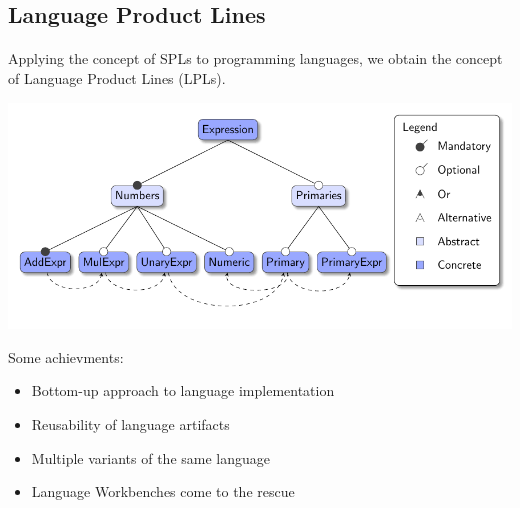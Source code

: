 \documentclass[9pt,xcolor=table,svgnames]{beamer}
\begin{document}
\subsection[LPLs]{Language Product Lines}
\begin{frame}{\secname}
    \framesubtitle{\subsecname}
    Applying the concept of SPLs to programming languages, we obtain the concept of \alert{Language Product Lines} (LPLs).

    \bigskip
    \includegraphics[width=1\textwidth]{figs/feature-model.pdf}

    \pause

    \huge Some achievments:
    \begin{itemize}
        \item \alert{Bottom-up} approach to language implementation
        \item \alert{Reusability} of language artifacts
        \item Multiple \alert{variants} of the same language
        \item \alert{Language Workbenches} come to the rescue
    \end{itemize}
\end{frame}
\end{document}

